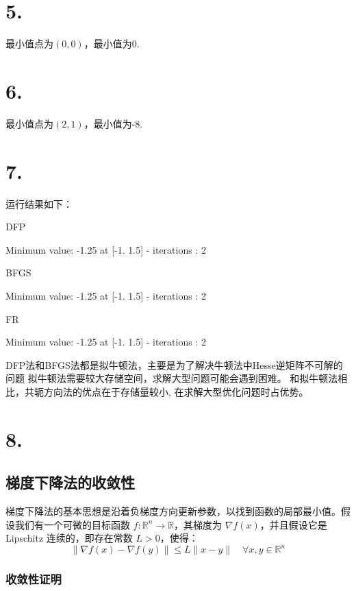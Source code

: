 \documentclass{article}
\begin{document}
    \section*{5.}

	最小值点为$(0,0)$，最小值为0.

    \section*{6.}

	最小值点为$(2,1)$，最小值为-8.
    
    \section*{7.}

    运行结果如下：

    DFP 
    
    Minimum value: -1.25 at [-1.   1.5] - iterations : 2

    BFGS 

    Minimum value: -1.25 at [-1.   1.5] - iterations : 2

    FR 
    
    Minimum value: -1.25 at [-1.   1.5] - iterations : 2

    DFP法和BFGS法都是拟牛顿法，主要是为了解决牛顿法中Hesse逆矩阵不可解的问题
    拟牛顿法需要较大存储空间，求解大型问题可能会遇到困难。
    和拟牛顿法相比，共轭方向法的优点在于存储量较小, 在求解大型优化问题时占优势。 

    \section*{8.}

    \subsection*{梯度下降法的收敛性}
    
    梯度下降法的基本思想是沿着负梯度方向更新参数，以找到函数的局部最小值。假设我们有一个可微的目标函数 $f: \mathbb{R}^n \to \mathbb{R}$，其梯度为 $\nabla f(x)$，并且假设它是Lipschitz 连续的，即存在常数 $L > 0$，使得：\[ \|\nabla f(x) - \nabla f(y)\| \leq L \|x - y\| \quad \forall x, y \in \mathbb{R}^n \]

    \subsubsection*{收敛性证明}
\end{document}
